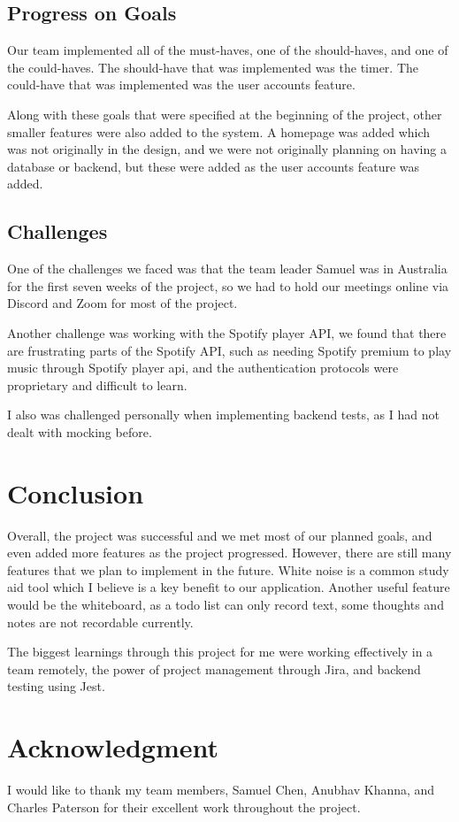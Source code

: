 \documentclass[conference]{IEEEtran}
\begin{document}
\subsection{Progress on Goals}
Our team implemented all of the must-haves, one of the should-haves, and one of the could-haves. The should-have that was implemented was the timer. The could-have that was implemented was the user accounts feature.

Along with these goals that were specified at the beginning of the project, other smaller features were also added to the system. A homepage was added which was not originally in the design, and we were not originally planning on having a database or backend, but these were added as the user accounts feature was added.


\subsection{Challenges}
One of the challenges we faced was that the team leader Samuel was in Australia for the first seven weeks of the project, so we had to hold our meetings online via Discord and Zoom for most of the project.

Another challenge was working with the Spotify player API, we found that there are frustrating parts of the Spotify API, such as needing Spotify premium to play music through Spotify player api, and the authentication protocols were proprietary and difficult to learn.

I also was challenged personally when implementing backend tests, as I had not dealt with mocking before.

\section{Conclusion}
Overall, the project was successful and we met most of our planned goals, and even added more features as the project progressed. However, there are still many features that we plan to implement in the future. White noise is a common study aid tool which I believe is a key benefit to our application. Another useful feature would be the whiteboard, as a todo list can only record text, some thoughts and notes are not recordable currently.

The biggest learnings through this project for me were working effectively in a team remotely, the power of project management through Jira, and backend testing using Jest.

\section*{Acknowledgment}
I would like to thank my team members, Samuel Chen, Anubhav Khanna, and Charles Paterson for their excellent work throughout the project.
\end{document}
